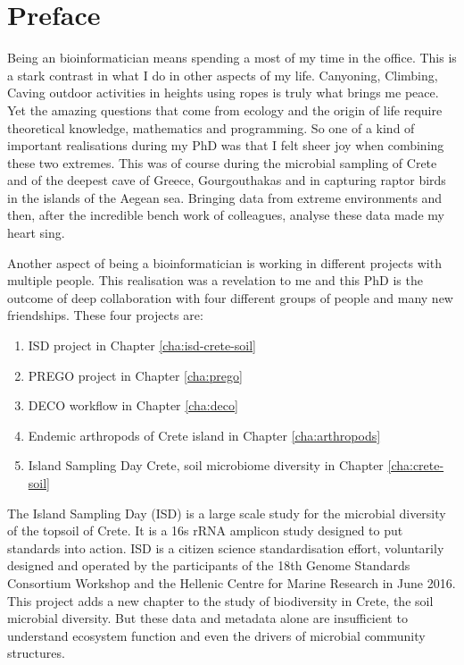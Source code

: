 \documentclass[
11pt, %
english, %
singlespacing, %
liststotoc, %
toctotoc, %
headsepline, %
]{MastersDoctoralThesis} %
\begin{document}

\chapter*{Preface}

Being an bioinformatician means spending a most of my time in the office. This is a 
stark contrast in what I do in other aspects of my life. Canyoning, Climbing, Caving 
outdoor activities in heights using ropes is truly what brings me peace. Yet the 
amazing questions that come from ecology and the origin of life require theoretical 
knowledge, mathematics and programming. So one of a kind of important realisations
during my PhD was that I felt sheer joy when combining these two extremes. This was
of course during the microbial sampling of Crete and of the deepest cave of Greece, Gourgouthakas
and in capturing raptor birds in the islands of the Aegean sea. Bringing data from 
extreme environments and then, after the incredible bench work of colleagues, analyse 
these data made my heart sing.

Another aspect of being a bioinformatician is working in different projects with 
multiple people. This realisation was a revelation to me and this PhD is the outcome 
of deep collaboration with four different groups of people and many new friendships. 
These four projects are:

\begin{enumerate}
    \item ISD project in Chapter \ref{cha:isd-crete-soil}
    \item PREGO project in Chapter \ref{cha:prego}
    \item DECO workflow in Chapter \ref{cha:deco}
    \item Endemic arthropods of Crete island in Chapter \ref{cha:arthropods}
    \item Island Sampling Day Crete, soil microbiome diversity in Chapter \ref{cha:crete-soil}
\end{enumerate}

The Island Sampling Day (ISD) is a large scale study for the microbial diversity of the
topsoil of Crete. It is a 16s rRNA amplicon study designed to put standards into action. 
ISD is a citizen science standardisation effort, voluntarily designed and
operated by the participants of the 18th Genome Standards Consortium
Workshop and the Hellenic Centre for Marine Research in June 2016.
This project adds a new chapter to the study of biodiversity in Crete,
the soil microbial diversity. But these data and metadata alone are 
insufficient to understand ecosystem function and even the drivers 
of microbial community structures.
\end{document}

